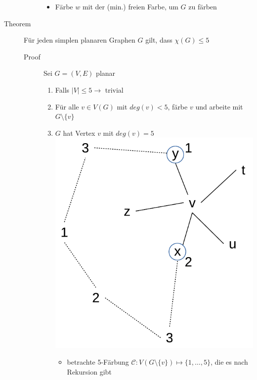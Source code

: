 \begin{description}
\begin{description}
\begin{itemize}
                \item Färbe $w$ mit der (min.) freien Farbe, um $G$ zu färben
            \end{itemize}
        \end{description}
    \item[Theorem] Für jeden simplen planaren Graphen $G$ gilt, dass $\chi(G) \leqslant 5$
        \begin{description}
            \item[Proof] Sei $G=(V,E)$ planar
                \begin{enumerate}
                    \item Falls $|V| \leqslant 5 \rightarrow$ trivial
                    \item Für alle $v \in V(G)$ mit $deg(v) < 5$, färbe $v$ und arbeite mit $G \setminus \{v\}$
                    \item $G$ hat Vertex $v$ mit $deg(v) = 5$
                        \includegraphics[scale=0.4]{lectures/161125/pix/2.pdf}
                        \begin{itemize}
                            \item betrachte 5-Färbung $\mathcal{C} \colon V(G \setminus \{v\}) \mapsto \{1, \dots, 5\}$, die es nach Rekursion gibt

\end{itemize}
\end{enumerate}
\end{description}
\end{description}
